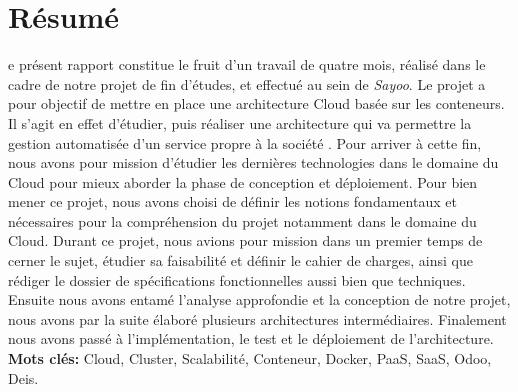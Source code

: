 
\chapter*{Résumé}

\begin{onehalfspace}
e présent rapport constitue le fruit d'un travail de quatre mois, réalisé dans le cadre de notre projet de fin d'études, et effectué au sein de \emph{Sayoo}. Le projet a pour objectif de mettre en place une architecture Cloud basée sur les conteneurs.
\newline
\newline
Il s'agit en effet d'étudier, puis réaliser une architecture qui va permettre la gestion automatisée d'un service propre à la société . Pour arriver à cette fin, nous avons pour mission d'étudier les dernières technologies dans le domaine du Cloud pour mieux aborder la phase de conception et déploiement. 
\noindent Pour bien mener ce projet, nous avons choisi de définir les notions fondamentaux et nécessaires pour la compréhension du projet notamment dans le domaine du Cloud.
\newline
\newline
Durant ce projet, nous avions pour mission dans un premier temps de cerner le sujet, étudier sa faisabilité et définir le cahier de charges, ainsi que rédiger le dossier de spécifications fonctionnelles aussi bien que techniques. Ensuite nous avons entamé l'analyse approfondie et la conception de notre projet, nous avons par la suite élaboré plusieurs architectures intermédiaires. Finalement nous avons passé à l'implémentation, le test et le déploiement de l'architecture.
\vfill{\textbf{Mots clés:} Cloud, Cluster, Scalabilité, Conteneur, Docker, PaaS, SaaS, Odoo, Deis.}
\end{onehalfspace}
